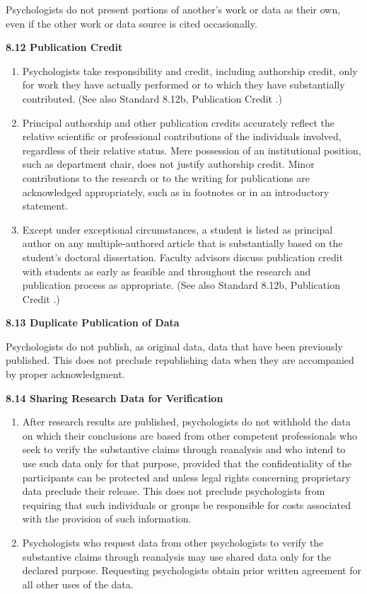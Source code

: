 \documentclass[
]{krantz}
\begin{document}
Psychologists do not present portions of another's work or data as their own, even if the other work or data source is cited occasionally.

\textbf{8.12 Publication Credit}

\begin{enumerate}
\def\labelenumi{(\alph{enumi})}
\item
  Psychologists take responsibility and credit, including authorship credit, only for work they have actually performed or to which they have substantially contributed. (See also Standard 8.12b, Publication Credit .)
\item
  Principal authorship and other publication credits accurately reflect the relative scientific or professional contributions of the individuals involved, regardless of their relative status. Mere possession of an institutional position, such as department chair, does not justify authorship credit. Minor contributions to the research or to the writing for publications are acknowledged appropriately, such as in footnotes or in an introductory statement.
\item
  Except under exceptional circumstances, a student is listed as principal author on any multiple-authored article that is substantially based on the student's doctoral dissertation. Faculty advisors discuss publication credit with students as early as feasible and throughout the research and publication process as appropriate. (See also Standard 8.12b, Publication Credit .)
\end{enumerate}

\textbf{8.13 Duplicate Publication of Data}

Psychologists do not publish, as original data, data that have been previously published. This does not preclude republishing data when they are accompanied by proper acknowledgment.

\textbf{8.14 Sharing Research Data for Verification}

\begin{enumerate}
\def\labelenumi{(\alph{enumi})}
\item
  After research results are published, psychologists do not withhold the data on which their conclusions are based from other competent professionals who seek to verify the substantive claims through reanalysis and who intend to use such data only for that purpose, provided that the confidentiality of the participants can be protected and unless legal rights concerning proprietary data preclude their release. This does not preclude psychologists from requiring that such individuals or groups be responsible for costs associated with the provision of such information.
\item
  Psychologists who request data from other psychologists to verify the substantive claims through reanalysis may use shared data only for the declared purpose. Requesting psychologists obtain prior written agreement for all other uses of the data.
\end{enumerate}
\end{document}
